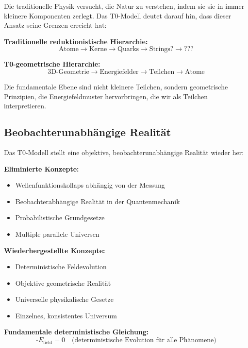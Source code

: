 \documentclass[12pt,a4paper]{report}
\begin{document}
	Die traditionelle Physik versucht, die Natur zu verstehen, indem sie sie in immer kleinere Komponenten zerlegt. Das T0-Modell deutet darauf hin, dass dieser Ansatz seine Grenzen erreicht hat:
	
	\textbf{Traditionelle reduktionistische Hierarchie:}
	\begin{equation}
		\text{Atome} \rightarrow \text{Kerne} \rightarrow \text{Quarks} \rightarrow \text{Strings?} \rightarrow \text{???}
	\end{equation}
	
	\textbf{T0-geometrische Hierarchie:}
	\begin{equation}
		\text{3D-Geometrie} \rightarrow \text{Energiefelder} \rightarrow \text{Teilchen} \rightarrow \text{Atome}
	\end{equation}
	
	Die fundamentale Ebene sind nicht kleinere Teilchen, sondern geometrische Prinzipien, die Energiefeldmuster hervorbringen, die wir als Teilchen interpretieren.
	
	\subsection{Beobachterunabhängige Realität}
	\label{subsec:observer_independent_reality}
	
	Das T0-Modell stellt eine objektive, beobachterunabhängige Realität wieder her:
	
	\textbf{Eliminierte Konzepte:}
	\begin{itemize}
		\item Wellenfunktionskollaps abhängig von der Messung
		\item Beobachterabhängige Realität in der Quantenmechanik
		\item Probabilistische Grundgesetze
		\item Multiple parallele Universen
	\end{itemize}
	
	\textbf{Wiederhergestellte Konzepte:}
	\begin{itemize}
		\item Deterministische Feldevolution
		\item Objektive geometrische Realität
		\item Universelle physikalische Gesetze
		\item Einzelnes, konsistentes Universum
	\end{itemize}
	
	\textbf{Fundamentale deterministische Gleichung:}
	\begin{equation}
		\square E_{\text{field}} = 0 \quad \text{(deterministische Evolution für alle Phänomene)}
	\end{equation}
	
\end{document}
